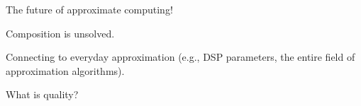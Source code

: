 The future of approximate computing!

Composition is unsolved.

Connecting to everyday approximation (e.g., DSP parameters, the entire field
of approximation algorithms).

What is quality?
